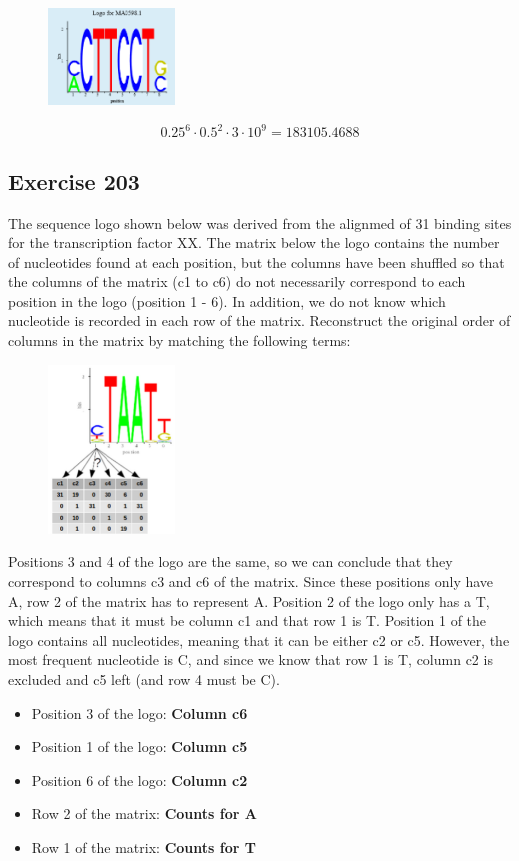 \begin{figure}[htbp]
\centering
\includegraphics[width = 0.3\textwidth]{figs/exam-ex204.png}
\end{figure}

$$0.25^6 \cdot 0.5^2 \cdot 3 \cdot 10^9 = 183105.4688$$

\subsection{Exercise 203}
The sequence logo shown below was derived from the alignmed of 31 binding sites for the transcription factor XX. The matrix below the logo contains the number of nucleotides found at each position, but the columns have been shuffled so that the columns of the matrix (c1 to c6) do not necessarily correspond to each position in the logo (position 1 - 6). In addition, we do not know which nucleotide is recorded in each row of the matrix. Reconstruct the original order of columns in the matrix by matching the following terms:

\begin{figure}[htbp]
\centering
\includegraphics[width = 0.3\textwidth]{figs/exam-ex203.png}
\end{figure}

Positions 3 and 4 of the logo are the same, so we can conclude that they correspond to columns c3 and c6 of the matrix. Since these positions only have A, row 2 of the matrix has to represent A. Position 2 of the logo only has a T, which means that it must be column c1 and that row 1 is T. Position 1 of the logo contains all nucleotides, meaning that it can be either c2 or c5. However, the most frequent nucleotide is C, and since we know that row 1 is T, column c2 is excluded and c5 left (and row 4 must be C).

\begin{itemize}
\item Position 3 of the logo: \textbf{Column c6}
\item Position 1 of the logo: \textbf{Column c5}
\item Position 6 of the logo: \textbf{Column c2}
\item Row 2 of the matrix: \textbf{Counts for A}
\item Row 1 of the matrix: \textbf{Counts for T}
\end{itemize}